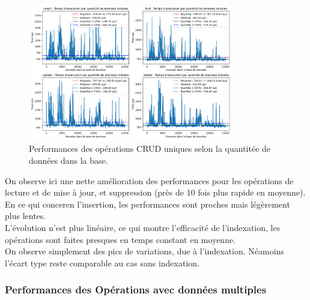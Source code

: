 \documentclass[12pt,a4paper]{report}
\begin{document}
                \begin{figure}[H]
                    \centering
                    \includegraphics[width=0.8\textwidth]{../plots/MongoDB/standalone_indexed/test_one_various_data.png}
                    \caption{Performances des opérations CRUD uniques selon la quantitée de données dans la base.}
                    \label{fig:mongo_standalone_global_one_various_indexed}
                \end{figure}

                \begin{card}
                    On observe ici une nette amélioration des performances pour les opérations de lecture et de mise à jour, et suppression (près de 10 fois plus rapide en moyenne).\\
                    En ce qui conceren l'insertion, les performances sont proches mais légèrement plus lentes. \\
                    L'évolution n'est plus linéaire, ce qui montre l'efficacité de l'indexation, les opérations sont faites presques en temps constant en moyenne. \\
                    On observe simplement des pics de variations, due à l'indexation. Néamoins l'écart type reste comparable au cas sans indexation. 
                \end{card}

            \subsubsection{Performances des Opérations avec données multiples}
\end{document}
